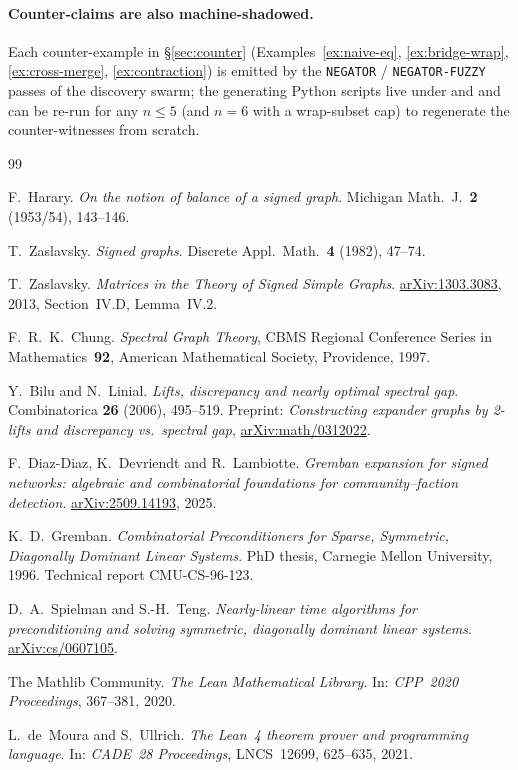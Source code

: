 \documentclass[11pt,a4paper]{amsart}
\theoremstyle{plain}
\theoremstyle{definition}
\theoremstyle{remark}
\begin{document}
\paragraph{Counter-claims are also machine-shadowed.} Each
counter-example in \S\ref{sec:counter} (Examples~\ref{ex:naive-eq},
\ref{ex:bridge-wrap}, \ref{ex:cross-merge}, \ref{ex:contraction})
is emitted by the \texttt{NEGATOR} / \texttt{NEGATOR-FUZZY} passes
of the discovery swarm; the generating Python scripts live under
 and
 and can be re-run for any
$n\le 5$ (and $n=6$ with a wrap-subset cap) to regenerate the
counter-witnesses from scratch.

\begin{thebibliography}{99}

F.~Harary.
\emph{On the notion of balance of a signed graph}.
Michigan Math.\ J.\ \textbf{2} (1953/54), 143--146.

T.~Zaslavsky.
\emph{Signed graphs}.
Discrete Appl.\ Math.\ \textbf{4} (1982), 47--74.

T.~Zaslavsky.
\emph{Matrices in the Theory of Signed Simple Graphs}.
\href{https://arxiv.org/abs/1303.3083}{arXiv:1303.3083}, 2013,
Section~IV.D, Lemma~IV.2.

F.~R.~K.~Chung.
\emph{Spectral Graph Theory},
CBMS Regional Conference Series in Mathematics~\textbf{92},
American Mathematical Society, Providence, 1997.

Y.~Bilu and N.~Linial.
\emph{Lifts, discrepancy and nearly optimal spectral gap}.
Combinatorica \textbf{26} (2006), 495--519.
Preprint: \emph{Constructing expander graphs by 2-lifts and discrepancy
vs.\ spectral gap},
\href{https://arxiv.org/abs/math/0312022}{arXiv:math/0312022}.

F.~Diaz-Diaz, K.~Devriendt and R.~Lambiotte.
\emph{Gremban expansion for signed networks: algebraic and combinatorial
foundations for community--faction detection}.
\href{https://arxiv.org/abs/2509.14193}{arXiv:2509.14193}, 2025.

K.~D.~Gremban.
\emph{Combinatorial Preconditioners for Sparse, Symmetric, Diagonally
Dominant Linear Systems}.
PhD thesis, Carnegie Mellon University, 1996.
Technical report CMU-CS-96-123.

D.~A.~Spielman and S.-H.~Teng.
\emph{Nearly-linear time algorithms for preconditioning and solving
symmetric, diagonally dominant linear systems}.
\href{https://arxiv.org/abs/cs/0607105}{arXiv:cs/0607105}.

The Mathlib Community.
\emph{The Lean Mathematical Library}.
In: \emph{CPP~2020 Proceedings}, 367--381, 2020.

L.~de~Moura and S.~Ullrich.
\emph{The Lean~4 theorem prover and programming language}.
In: \emph{CADE~28 Proceedings}, LNCS~12699, 625--635, 2021.

\end{thebibliography}
\end{document}
